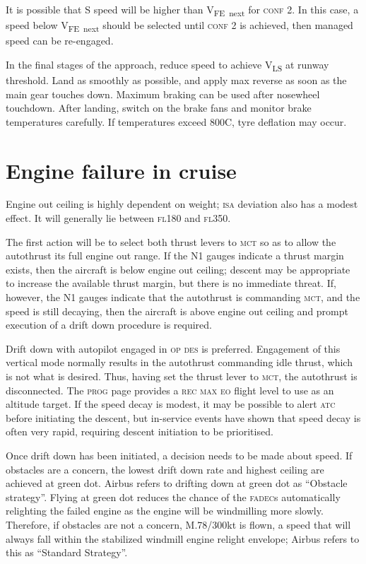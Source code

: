 \documentclass[a5paper,11pt,twoside]{book}
\newcommand{\ac}[1]{{\scshape\MakeLowercase{#1}}}
\newcommand{\inlcite}[1]{{\ac{#1}}}
\newcommand{\multicite}[1]{%
  \nopagebreak
  \noindent{{\color{blue}\footnotesize[ \inlcite{#1} ]}}
}
\newcommand{\V}[1]{V\textsubscript{#1}}
\begin{document}
It is possible that S speed will be higher than \V{FE~next} for \ac{CONF} 2. In this
case, a speed below \V{FE~next} should be selected until \ac{CONF} 2 is achieved,
then managed speed can be re-engaged.

In the final stages of the approach, reduce speed to achieve \V{LS} at runway
threshold. Land as smoothly as possible, and apply max reverse as soon as the
main gear touches down. Maximum braking can be used after nosewheel
touchdown. After landing, switch on the brake fans and monitor brake
temperatures carefully. If temperatures exceed 800\textdegree C, tyre deflation
may occur.

\multicite{QRH~AER.MISC, FCOM~PRO.AER.MISC, FCTM~PRO.AER.MISC}

\section{Engine failure in cruise}

Engine out ceiling is highly dependent on weight; \ac{ISA} deviation also has a
modest effect. It will generally lie between \ac{FL}180 and \ac{FL}350.

The first action will be to select both thrust levers to \ac{MCT} so as to allow
the autothrust its full engine out range. If the N1 gauges indicate a thrust
margin exists, then the aircraft is below engine out ceiling; descent may be
appropriate to increase the available thrust margin, but there is no immediate
threat. If, however, the N1 gauges indicate that the autothrust is commanding
\ac{MCT}, and the speed is still decaying, then the aircraft is above engine out
ceiling and prompt execution of a drift down procedure is required.

Drift down with autopilot engaged in \ac{OP} \ac{DES} is preferred. Engagement
of this vertical mode normally results in the autothrust commanding idle thrust,
which is not what is desired. Thus, having set the thrust lever to \ac{MCT}, the
autothrust is disconnected. The \ac{PROG} page provides a \ac{REC MAX EO} flight
level to use as an altitude target. If the speed decay is modest, it may be
possible to alert \ac{ATC} before initiating the descent, but in-service events
have shown that speed decay is often very rapid, requiring descent initiation to
be prioritised.

Once drift down has been initiated, a decision needs to be made about speed. If
obstacles are a concern, the lowest drift down rate and highest ceiling are
achieved at green dot. Airbus refers to drifting down at green dot as ``Obstacle
strategy''. Flying at green dot reduces the chance of the \ac{FADEC}s
automatically relighting the failed engine as the engine will be windmilling
more slowly. Therefore, if obstacles are not a concern, M.78/300kt is flown, a
speed that will always fall within the stabilized windmill engine relight
envelope; Airbus refers to this as ``Standard Strategy''.
\end{document}
